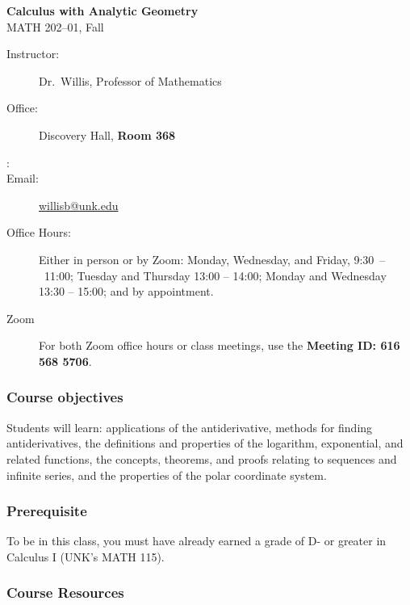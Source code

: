\documentclass[12pt]{article}
\newcounter{ex}\setcounter{ex}{0}
\newcommand{\term}{Fall }
\newcommand{\RomanNumeralCaps}[1]
      {\MakeUppercase{\romannumeral #1}}
\begin{document}
\large
\begin{center}
    \textbf{Calculus \RomanNumeralCaps{2} with Analytic Geometry}  \\
    {MATH 202--01,  \term \the\year} \\
\end{center}

\vskip0.25in
\normalsize


\begin{center}
\begin{description}
    \item[Instructor:] Dr.\  Willis, Professor of Mathematics
    \item[Office:]  Discovery Hall,  \textbf{ Room 368}
    \item[\phone:]  
    \item[Email:] \href{mailto:willisb@unk.edu}{willisb@unk.edu}
    \item[Office Hours:] Either in person or by Zoom: Monday, Wednesday, and  Friday, \mbox{9:30 -- 11:00}; Tuesday and Thursday 13:00 -- 14:00; Monday and Wednesday 13:30 -- 15:00;  and by appointment.
    \item[Zoom] For both Zoom office hours or class meetings, use the \textbf{Meeting ID: 616 568 5706}.
 \end{description}
\end{center}

\subsubsection*{Course objectives}

Students will learn: applications of the antiderivative, methods for finding antiderivatives, the definitions and properties of the logarithm, exponential, and related functions,
the concepts, theorems, and proofs relating to sequences and infinite series, and the properties of the polar coordinate system.

\subsubsection*{Prerequisite}

To be in this class, you must have already earned a grade of D- or  greater  in  Calculus I (UNK's MATH 115).

\subsubsection*{Course Resources}
\end{document}
